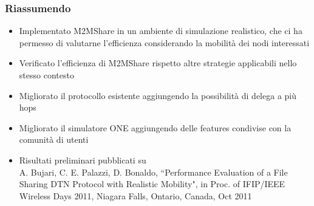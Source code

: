 \documentclass{beamer}
\begin{document}
%

\begin{frame}
\frametitle{Riassumendo}
\label{Riassumendo}
\begin{itemize}
\item Implementato M2MShare in un ambiente di simulazione realistico, che ci ha permesso di valutarne l'efficienza considerando la mobilità dei nodi interessati
\item Verificato l'efficienza di M2MShare rispetto altre strategie applicabili nello stesso contesto
\item Migliorato il protocollo esistente aggiungendo la possibilità di delega a più hops
\item Migliorato il simulatore ONE aggiungendo delle features condivise con la comunità di utenti
\item Risultati preliminari pubblicati su\\
A. Bujari, C. E. Palazzi, D. Bonaldo, ``Performance Evaluation of a File Sharing DTN Protocol with Realistic Mobility", in Proc. of IFIP/IEEE Wireless Days 2011, Niagara
Falls, Ontario, Canada, Oct 2011
\end{itemize}
\end{frame}
\end{document}
